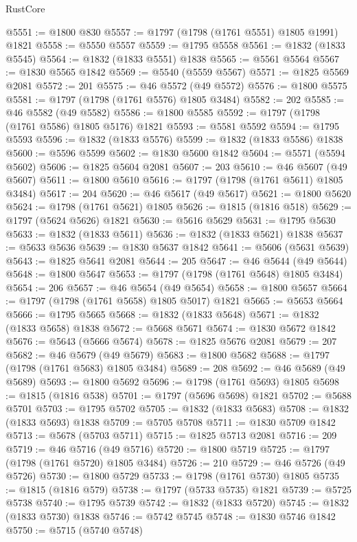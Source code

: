 \begin{lexlean}{RustCore}
\begin{coremodule}
@5551 := @1800 @830
@5557 := @1797 (@1798 (@1761 @5551) @1805 @1991) @1821
@5558 := @5550 @5557
@5559 := @1795 @5558
@5561 := @1832 (@1833 @5545)
@5564 := @1832 (@1833 @5551) @1838
@5565 := @5561 @5564
@5567 := @1830 @5565 @1842
@5569 := @5540 (@5559 @5567)
@5571 := @1825 @5569 @2081
@5572 := 201
@5575 := @46 @5572 (@49 @5572)
@5576 := @1800 @5575
@5581 := @1797 (@1798 (@1761 @5576) @1805 @3484)
@5582 := 202
@5585 := @46 @5582 (@49 @5582)
@5586 := @1800 @5585
@5592 := @1797 (@1798 (@1761 @5586) @1805 @5176) @1821
@5593 := @5581 @5592
@5594 := @1795 @5593
@5596 := @1832 (@1833 @5576)
@5599 := @1832 (@1833 @5586) @1838
@5600 := @5596 @5599
@5602 := @1830 @5600 @1842
@5604 := @5571 (@5594 @5602)
@5606 := @1825 @5604 @2081
@5607 := 203
@5610 := @46 @5607 (@49 @5607)
@5611 := @1800 @5610
@5616 := @1797 (@1798 (@1761 @5611) @1805 @3484)
@5617 := 204
@5620 := @46 @5617 (@49 @5617)
@5621 := @1800 @5620
@5624 := @1798 (@1761 @5621) @1805
@5626 := @1815 (@1816 @518)
@5629 := @1797 (@5624 @5626) @1821
@5630 := @5616 @5629
@5631 := @1795 @5630
@5633 := @1832 (@1833 @5611)
@5636 := @1832 (@1833 @5621) @1838
@5637 := @5633 @5636
@5639 := @1830 @5637 @1842
@5641 := @5606 (@5631 @5639)
@5643 := @1825 @5641 @2081
@5644 := 205
@5647 := @46 @5644 (@49 @5644)
@5648 := @1800 @5647
@5653 := @1797 (@1798 (@1761 @5648) @1805 @3484)
@5654 := 206
@5657 := @46 @5654 (@49 @5654)
@5658 := @1800 @5657
@5664 := @1797 (@1798 (@1761 @5658) @1805 @5017) @1821
@5665 := @5653 @5664
@5666 := @1795 @5665
@5668 := @1832 (@1833 @5648)
@5671 := @1832 (@1833 @5658) @1838
@5672 := @5668 @5671
@5674 := @1830 @5672 @1842
@5676 := @5643 (@5666 @5674)
@5678 := @1825 @5676 @2081
@5679 := 207
@5682 := @46 @5679 (@49 @5679)
@5683 := @1800 @5682
@5688 := @1797 (@1798 (@1761 @5683) @1805 @3484)
@5689 := 208
@5692 := @46 @5689 (@49 @5689)
@5693 := @1800 @5692
@5696 := @1798 (@1761 @5693) @1805
@5698 := @1815 (@1816 @538)
@5701 := @1797 (@5696 @5698) @1821
@5702 := @5688 @5701
@5703 := @1795 @5702
@5705 := @1832 (@1833 @5683)
@5708 := @1832 (@1833 @5693) @1838
@5709 := @5705 @5708
@5711 := @1830 @5709 @1842
@5713 := @5678 (@5703 @5711)
@5715 := @1825 @5713 @2081
@5716 := 209
@5719 := @46 @5716 (@49 @5716)
@5720 := @1800 @5719
@5725 := @1797 (@1798 (@1761 @5720) @1805 @3484)
@5726 := 210
@5729 := @46 @5726 (@49 @5726)
@5730 := @1800 @5729
@5733 := @1798 (@1761 @5730) @1805
@5735 := @1815 (@1816 @579)
@5738 := @1797 (@5733 @5735) @1821
@5739 := @5725 @5738
@5740 := @1795 @5739
@5742 := @1832 (@1833 @5720)
@5745 := @1832 (@1833 @5730) @1838
@5746 := @5742 @5745
@5748 := @1830 @5746 @1842
@5750 := @5715 (@5740 @5748)

\end{coremodule}
\end{lexlean}
